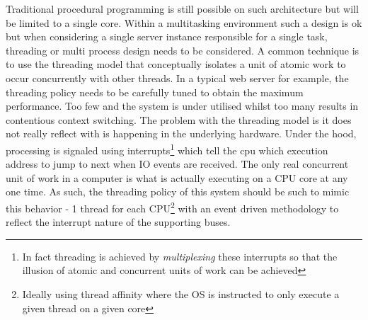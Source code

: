 \documentclass[a4paper,11pt]{scrreprt}
\begin{document}
Traditional procedural programming is still possible on such architecture but will be limited to a single core. Within a multitasking environment such a design is ok but when considering a single server instance responsible for a single task, threading or multi process design needs to be considered. A common technique is to use the threading model that conceptually isolates a unit of atomic work to occur concurrently with other threads. In a typical web server for example, the threading policy needs to be carefully tuned to obtain the maximum performance. Too few and the system is under utilised whilst too many results in contentious context switching. The problem with the threading model is it does not really reflect with is happening in the underlying hardware. Under the hood, processing is signaled using interrupts\footnote{In fact threading is achieved by \textit{multiplexing} these interrupts so that the illusion of atomic and concurrent units of work can be achieved} which tell the cpu which execution address to jump to next when IO events are received. The only real concurrent unit of work in a computer is what is actually executing on a CPU core at any one time. As such, the threading policy of this system should be such to mimic this behavior - 1 thread for each CPU\footnote{Ideally using thread affinity where the OS is instructed to only execute a given thread on a given core} with an event driven methodology to reflect the interrupt nature of the supporting buses.
\end{document}
